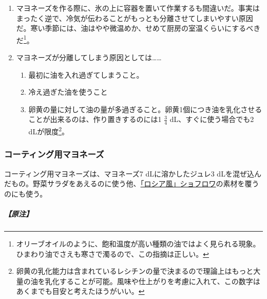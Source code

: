 \begin{recette}
\begin{enumerate}
\def\labelenumi{\arabic{enumi}.}
\setcounter{enumi}{1}
\item
  マヨネーズを作る際に、氷の上に容器を置いて作業するも間違いだ。事実はまったく逆で、冷気が伝わることがもっとも分離させてしまいやすい原因だ。寒い季節には、油はやや微温めか、せめて厨房の室温くらいにするべきだ\footnote{オリーブオイルのように、飽和温度が高い種類の油ではよく見られる現象。ひまわり油でさえも寒さで濁るので、この指摘は正しい。}。
\item
  マヨネーズが分離してしまう原因としては\ldots{}\ldots{}

  \begin{enumerate}
  \def\labelenumii{\arabic{enumii}.}
  \tightlist
  \item
    最初に油を入れ過ぎてしまうこと。
  \item
    冷え過ぎた油を使うこと
  \item
    卵黄の量に対して油の量が多過ぎること。卵黄1個につき油を乳化させることが出来るのは、作り置きするのには1
    \(\frac{3}{4}\) dL、すぐに使う場合でも2 dLが限度\footnote{卵黄の乳化能力は含まれているレシチンの量で決まるので理論上はもっと大量の油を乳化することが可能。風味や仕上がりを考慮に入れて、この数字はあくまでも目安と考えたほうがいい。}。
  \end{enumerate}
\end{enumerate}

\hypertarget{mayonnaise-collee}{%
\subsubsection{コーティング用マヨネーズ}\label{mayonnaise-collee}}



コーティング用マヨネーズは、マヨネーズ7 dLに溶かしたジュレ3
dLを混ぜ込んだもの。野菜サラダをあえるのに使う他、\protect\hyperlink{}{「ロシア風」ショフロワ}の素材を覆うのにも使う。

\hypertarget{nota-mayonnaise-collee}{%
\subparagraph{【原注】}\label{nota-mayonnaise-collee}}


\end{recette}
